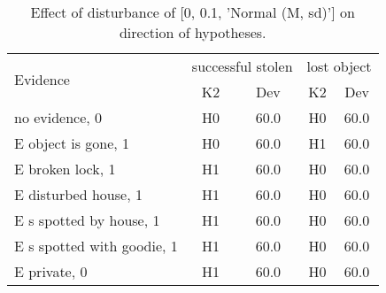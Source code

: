 \begin{table}\begin{tabular}{l|cc|cc}\toprule\multirow{2}{*}{Evidence} & \multicolumn{2}{c}{successful stolen}& \multicolumn{2}{c}{lost object}\\& {K2} & {Dev}& {K2} & {Dev}\\\midrule
no evidence, 0 & \cellcolor{Bittersweet}H0&\cellcolor{Bittersweet}60.0&\cellcolor{Bittersweet}H0&\cellcolor{Bittersweet}60.0\\E object is gone, 1 & \cellcolor{Bittersweet}H0&\cellcolor{Bittersweet}60.0&\cellcolor{Bittersweet}H1&\cellcolor{Bittersweet}60.0\\E broken lock, 1 & \cellcolor{Bittersweet}H1&\cellcolor{Bittersweet}60.0&\cellcolor{Bittersweet}H0&\cellcolor{Bittersweet}60.0\\E disturbed house, 1 & \cellcolor{Bittersweet}H1&\cellcolor{Bittersweet}60.0&\cellcolor{Bittersweet}H0&\cellcolor{Bittersweet}60.0\\E s spotted by house, 1 & \cellcolor{Bittersweet}H1&\cellcolor{Bittersweet}60.0&\cellcolor{Bittersweet}H0&\cellcolor{Bittersweet}60.0\\E s spotted with goodie, 1 & \cellcolor{Bittersweet}H1&\cellcolor{Bittersweet}60.0&\cellcolor{Bittersweet}H0&\cellcolor{Bittersweet}60.0\\E private, 0 & \cellcolor{Bittersweet}H1&\cellcolor{Bittersweet}60.0&\cellcolor{Bittersweet}H0&\cellcolor{Bittersweet}60.0\\\bottomrule\end{tabular}\caption{Effect of disturbance of [0, 0.1, 'Normal (M, sd)'] on direction of hypotheses.}\end{table}